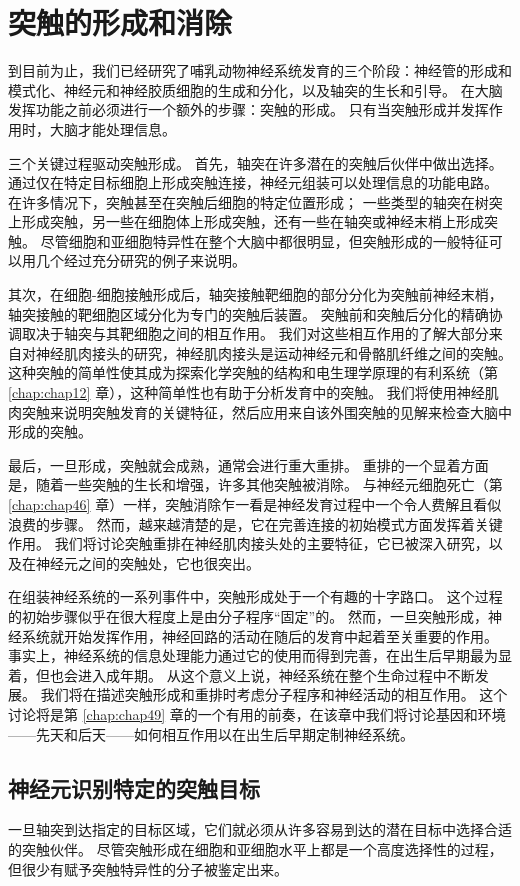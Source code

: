 \chapter{突触的形成和消除} \label{chap:chap48}

到目前为止，我们已经研究了哺乳动物神经系统发育的三个阶段：神经管的形成和模式化、神经元和神经胶质细胞的生成和分化，以及轴突的生长和引导。 在大脑发挥功能之前必须进行一个额外的步骤：突触的形成。 只有当突触形成并发挥作用时，大脑才能处理信息。

三个关键过程驱动突触形成。 首先，轴突在许多潜在的突触后伙伴中做出选择。 通过仅在特定目标细胞上形成突触连接，神经元组装可以处理信息的功能电路。 在许多情况下，突触甚至在突触后细胞的特定位置形成； 一些类型的轴突在树突上形成突触，另一些在细胞体上形成突触，还有一些在轴突或神经末梢上形成突触。 尽管细胞和亚细胞特异性在整个大脑中都很明显，但突触形成的一般特征可以用几个经过充分研究的例子来说明。

其次，在细胞-细胞接触形成后，轴突接触靶细胞的部分分化为突触前神经末梢，轴突接触的靶细胞区域分化为专门的突触后装置。 突触前和突触后分化的精确协调取决于轴突与其靶细胞之间的相互作用。 我们对这些相互作用的了解大部分来自对神经肌肉接头的研究，神经肌肉接头是运动神经元和骨骼肌纤维之间的突触。 这种突触的简单性使其成为探索化学突触的结构和电生理学原理的有利系统（第 \ref{chap:chap12} 章），这种简单性也有助于分析发育中的突触。 我们将使用神经肌肉突触来说明突触发育的关键特征，然后应用来自该外围突触的见解来检查大脑中形成的突触。

最后，一旦形成，突触就会成熟，通常会进行重大重排。 重排的一个显着方面是，随着一些突触的生长和增强，许多其他突触被消除。 与神经元细胞死亡（第 \ref{chap:chap46} 章）一样，突触消除乍一看是神经发育过程中一个令人费解且看似浪费的步骤。 然而，越来越清楚的是，它在完善连接的初始模式方面发挥着关键作用。 我们将讨论突触重排在神经肌肉接头处的主要特征，它已被深入研究，以及在神经元之间的突触处，它也很突出。

在组装神经系统的一系列事件中，突触形成处于一个有趣的十字路口。 这个过程的初始步骤似乎在很大程度上是由分子程序“固定”的。 然而，一旦突触形成，神经系统就开始发挥作用，神经回路的活动在随后的发育中起着至关重要的作用。 事实上，神经系统的信息处理能力通过它的使用而得到完善，在出生后早期最为显着，但也会进入成年期。 从这个意义上说，神经系统在整个生命过程中不断发展。 我们将在描述突触形成和重排时考虑分子程序和神经活动的相互作用。 这个讨论将是第 \ref{chap:chap49} 章的一个有用的前奏，在该章中我们将讨论基因和环境——先天和后天——如何相互作用以在出生后早期定制神经系统。


\section{神经元识别特定的突触目标}
一旦轴突到达指定的目标区域，它们就必须从许多容易到达的潜在目标中选择合适的突触伙伴。 尽管突触形成在细胞和亚细胞水平上都是一个高度选择性的过程，但很少有赋予突触特异性的分子被鉴定出来。

